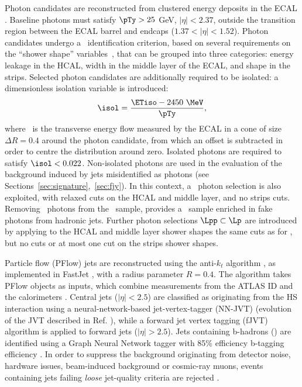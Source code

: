 Photon candidates are reconstructed from clustered energy deposits in the ECAL \cite{EGAM-2018-01,
PERF-2017-03}. Baseline photons must
satisfy $\pTy>25$ GeV, $|\eta|<2.37$, outside the transition region between the ECAL barrel and endcaps ($1.37< |\eta| < 1.52$). Photon candidates undergo a \T\ identification criterion, based on several requirements on the ``shower shape'' variables~\cite{PERF-2013-04,PERF-2017-02}, that can be grouped into three categories: energy leakage in the HCAL, width in the middle layer of the ECAL, and shape in the strips. 
Selected photon candidates are additionally required to be isolated: a dimensionless isolation variable is introduced:
\begin{equation}\label{eq:iso}
\isol=\dfrac{\ETiso-2450~\MeV}{\pTy},
\end{equation}
where \ETiso\ is the transverse energy flow measured by the ECAL in a cone of size $\Delta R=0.4$ around the photon candidate, from which an offset is subtracted in order to centre the distribution around zero. Isolated photons are required to satisfy $\isol<0.022$. 
Non-isolated photons are used in the evaluation of the background induced by jets misidentified as photons (see Sections~\ref{sec:signature},~\ref{sec:fjy}).
In this context, a \Loose\ photon selection is also exploited, with relaxed cuts on the HCAL and middle layer, and no strips cuts. Removing \T\ photons from the \Loose\ sample, provides a \Lp\ sample enriched in fake photons from hadronic jets. Further photon selections $\Lpp\subset\Lp$ are introduced by applying to the HCAL and middle layer shower shapes the same cuts as for \T, but no cuts or at most one cut on the strips shower shapes.

Particle flow (PFlow) jets are reconstructed using the anti-$k_t$ algorithm \cite{
Cacciari:2008gp}, as implemented in FastJet \cite{
Cacciari:2006sm}, with a radius parameter
$R = 0.4$. The algorithm takes PFlow objects as inputs, which combine measurements from the ATLAS ID and the calorimeters \cite{PERF-2015-09}.
Central jets ($|\eta| < 2.5$) are classified as originating from the HS interaction using a neural-network-based jet-vertex-tagger (NN-JVT) (evolution of the JVT described in Ref. \cite{PERF-2014-03}), while a forward jet vertex tagging (fJVT) algorithm \cite{PERF-2016-06} is applied to forward jets ($|\eta| > 2.5$).
Jets containing b-hadrons (\bjets) are identified using a Graph Neural Network tagger with 85\% efficiency b-tagging efficiency \cite{gnn-btagging}.
In order to suppress the background originating from detector noise, hardware issues, beam-induced background or cosmic-ray muons, events containing jets failing \textit{loose} jet-quality criteria are rejected \cite{ATLAS-CONF-2012-020}. 

